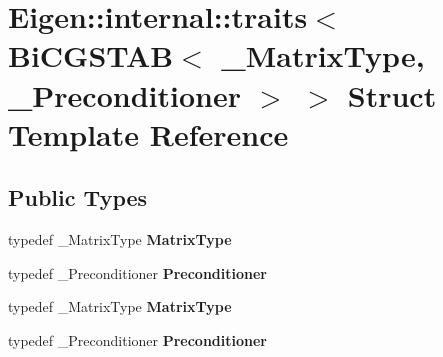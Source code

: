 \hypertarget{struct_eigen_1_1internal_1_1traits_3_01_bi_c_g_s_t_a_b_3_01___matrix_type_00_01___preconditioner_01_4_01_4}{}\section{Eigen\+:\+:internal\+:\+:traits$<$ Bi\+C\+G\+S\+T\+AB$<$ \+\_\+\+Matrix\+Type, \+\_\+\+Preconditioner $>$ $>$ Struct Template Reference}
\label{struct_eigen_1_1internal_1_1traits_3_01_bi_c_g_s_t_a_b_3_01___matrix_type_00_01___preconditioner_01_4_01_4}
\subsection*{Public Types}
\begin{DoxyCompactItemize}
\item 
\mbox{\label{struct_eigen_1_1internal_1_1traits_3_01_bi_c_g_s_t_a_b_3_01___matrix_type_00_01___preconditioner_01_4_01_4_ac1fa0313312d70262ae3f9f04b4d570f}} 
typedef \+\_\+\+Matrix\+Type {\bfseries Matrix\+Type}
\item 
\mbox{\label{struct_eigen_1_1internal_1_1traits_3_01_bi_c_g_s_t_a_b_3_01___matrix_type_00_01___preconditioner_01_4_01_4_a12b0145a10ef0ee5743dd0038027e8de}} 
typedef \+\_\+\+Preconditioner {\bfseries Preconditioner}
\item 
\mbox{\label{struct_eigen_1_1internal_1_1traits_3_01_bi_c_g_s_t_a_b_3_01___matrix_type_00_01___preconditioner_01_4_01_4_ac1fa0313312d70262ae3f9f04b4d570f}} 
typedef \+\_\+\+Matrix\+Type {\bfseries Matrix\+Type}
\item 
\mbox{\label{struct_eigen_1_1internal_1_1traits_3_01_bi_c_g_s_t_a_b_3_01___matrix_type_00_01___preconditioner_01_4_01_4_a12b0145a10ef0ee5743dd0038027e8de}} 
typedef \+\_\+\+Preconditioner {\bfseries Preconditioner}
\end{DoxyCompactItemize}


